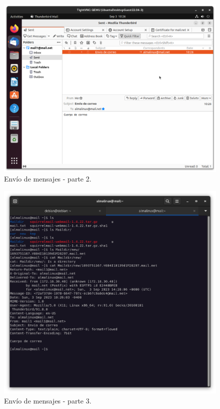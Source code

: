 \begin{figure}[H]
	\centering
	\includegraphics[scale=0.30]{19}
	\caption{Envío de mensajes - parte 2.}
\end{figure}

\begin{figure}[H]
	\centering
	\includegraphics[scale=0.30]{20}
	\caption{Envío de mensajes - parte 3.}
\end{figure}



